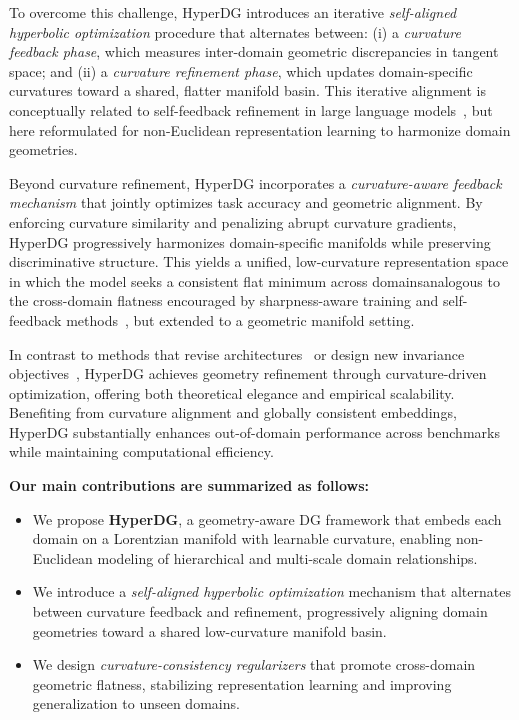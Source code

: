 \documentclass[10pt]{article} %
\begin{document}
To overcome this challenge, HyperDG introduces an iterative \textit{self-aligned hyperbolic optimization} procedure that alternates between: (i) a \textit{curvature feedback phase}, which measures inter-domain geometric discrepancies in tangent space; and (ii) a \textit{curvature refinement phase}, which updates domain-specific curvatures toward a shared, flatter manifold basin. This iterative alignment is conceptually related to self-feedback refinement in large language models~\cite{liang2024internal,madaan2023self}, but here reformulated for non-Euclidean representation learning to harmonize domain geometries.

Beyond curvature refinement, HyperDG incorporates a \textit{curvature-aware feedback mechanism} that jointly optimizes task accuracy and geometric alignment. By enforcing curvature similarity and penalizing abrupt curvature gradients, HyperDG progressively harmonizes domain-specific manifolds while preserving discriminative structure. This yields a unified, low-curvature representation space in which the model seeks a consistent flat minimum across domainsanalogous to the cross-domain flatness encouraged by sharpness-aware training and self-feedback methods~\cite{foret2020sharpness,li2025seeking,wang2023sharpness,zhang2023flatness,zhang2023gradient,zhuang2022surrogate}, but extended to a geometric manifold setting.

In contrast to methods that revise architectures~\cite{bai2021ood,li2020adapting,zhang2022delving} or design new invariance objectives~\cite{arjovsky2019invariant,krueger2021out,zhang2021adaptive}, HyperDG achieves geometry refinement through curvature-driven optimization, offering both theoretical elegance and empirical scalability. Benefiting from curvature alignment and globally consistent embeddings, HyperDG substantially enhances out-of-domain performance across benchmarks while maintaining computational efficiency.

\textbf{Our main contributions are summarized as follows:}
\begin{itemize}
    \item We propose \textbf{HyperDG}, a geometry-aware DG framework that embeds each domain on a Lorentzian manifold with learnable curvature, enabling non-Euclidean modeling of hierarchical and multi-scale domain relationships.
    \item We introduce a \textit{self-aligned hyperbolic optimization} mechanism that alternates between curvature feedback and refinement, progressively aligning domain geometries toward a shared low-curvature manifold basin.
    \item We design \textit{curvature-consistency regularizers} that promote cross-domain geometric flatness, stabilizing representation learning and improving generalization to unseen domains.
\end{itemize}
\end{document}
